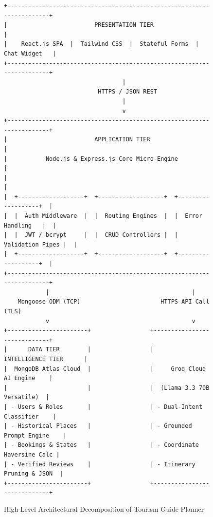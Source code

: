 \documentclass[12pt,a4paper,twoside,openright]{report}
\begin{document}
\begin{figure}[htbp]
\centering
\begin{verbatim}
+-----------------------------------------------------------------------+
|                         PRESENTATION TIER                             |
|    React.js SPA  |  Tailwind CSS  |  Stateful Forms  |  Chat Widget   |
+-----------------------------------------------------------------------+
                                  |
                           HTTPS / JSON REST
                                  |
                                  v
+-----------------------------------------------------------------------+
|                         APPLICATION TIER                              |
|           Node.js & Express.js Core Micro-Engine                      |
|                                                                       |
|  +-------------------+  +-------------------+  +-------------------+  |
|  |  Auth Middleware  |  |  Routing Engines  |  |  Error Handling   |  |
|  |  JWT / bcrypt     |  |  CRUD Controllers |  |  Validation Pipes |  |
|  +-------------------+  +-------------------+  +-------------------+  |
+-----------------------------------------------------------------------+
            |                                         |
    Mongoose ODM (TCP)                       HTTPS API Call (TLS)
            v                                         v
+-----------------------+                 +-----------------------------+
|      DATA TIER        |                 |      INTELLIGENCE TIER      |
|  MongoDB Atlas Cloud  |                 |     Groq Cloud AI Engine    |
|                       |                 |  (Llama 3.3 70B Versatile)  |
| - Users & Roles       |                 | - Dual-Intent Classifier    |
| - Historical Places   |                 | - Grounded Prompt Engine    |
| - Bookings & States   |                 | - Coordinate Haversine Calc |
| - Verified Reviews    |                 | - Itinerary Pruning & JSON  |
+-----------------------+                 +-----------------------------+
\end{verbatim}
\caption{High-Level Architectural Decomposition of Tourism Guide Planner}
\label{fig:high_level_arch}
\end{figure}
\end{document}

